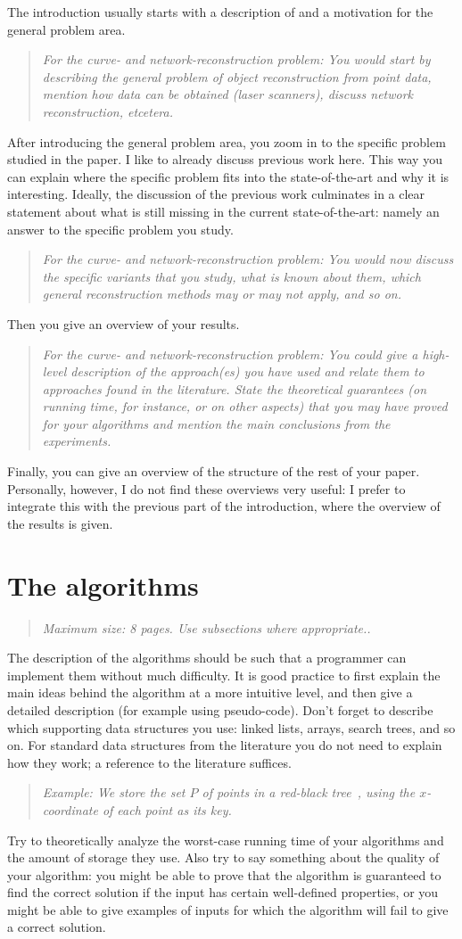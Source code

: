 \documentclass[11pt]{article}
\newcommand{\maxsize}[1]{\begin{quotation} {\sl \noindent Maximum size: #1.} \end{quotation}}
\newcommand{\crp}[1]{\begin{quotation} {\sl \noindent For the curve- and network-reconstruction problem: #1} \end{quotation}}
\newcommand{\example}[1]{\begin{quotation} {\sl \noindent Example: #1} \end{quotation}}
\begin{document}
The introduction usually starts with a description of and
a motivation for the general problem area.
%
\crp{You would start by
describing the general problem of object reconstruction from point data,
mention how data can be obtained (laser scanners), discuss network reconstruction, etcetera.}
%
After introducing the general problem area, you zoom in to the specific problem
studied in the paper. I like to already discuss previous work here. This way
you can explain where the specific problem fits into the state-of-the-art
and why it is interesting. Ideally, the discussion of the previous work
culminates in a clear statement about what is still missing in the current
state-of-the-art: namely an answer to the specific problem you study.
%
\crp{You would now discuss the specific variants that you study, 
what is known about them, which general reconstruction methods may or may not apply, and so on.}
%
Then you give an overview of your results.
%
\crp{You could give a high-level description of the
approach(es) you have used and relate them to approaches found in the literature.
State the theoretical guarantees (on running time,
for instance, or on other aspects) that you may have proved for your algorithms
and mention the main conclusions from the experiments.}
%
Finally, you can give an overview of the structure of the rest of your paper.
Personally, however, I do not find these overviews very useful: I prefer to
integrate this with the previous part of the introduction, where the overview
of the results is given.

\section{The algorithms}
\label{se:algorithms}
\maxsize{8 pages. Use subsections where appropriate.}
%
The description of the algorithms should be such that a programmer can
implement them without much difficulty. It is good practice to first explain the
main ideas behind the algorithm at a more intuitive level, and then give a
detailed description (for example using pseudo-code).
Don't forget to describe which supporting data structures you use:
linked lists, arrays, search trees, and so on. For standard data structures
from the literature you do not need to explain how they work; a reference
to the literature suffices.
%
\example{We store the set $P$ of points in a red-black tree~\cite{clrs-ia-01},
         using the $x$-coordinate of each point as its key.}
%
Try to theoretically analyze the worst-case running time of your algorithms
and the amount of storage they use. Also try to say something about the quality of your algorithm: you might
be able to prove that the algorithm is guaranteed to find the correct solution if the
input has certain well-defined properties, or you might be able to give examples
of inputs for which the algorithm will fail to give a correct solution.
\end{document}
